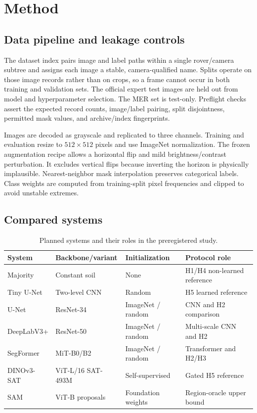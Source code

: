 \documentclass[11pt]{article}
\begin{document}
\section{Method}

\subsection{Data pipeline and leakage controls}

The dataset index pairs image and label paths within a single rover/camera subtree and assigns each
image a stable, camera-qualified name. Splits operate on those image records rather than on crops,
so a frame cannot occur in both training and validation sets. The official expert test images are
held out from model and hyperparameter selection. The MER set is test-only. Preflight checks assert
the expected record counts, image/label pairing, split disjointness, permitted mask values, and
archive/index fingerprints.

Images are decoded as grayscale and replicated to three channels. Training and evaluation resize
to $512\times512$ pixels and use ImageNet normalization. The frozen augmentation recipe allows a
horizontal flip and mild brightness/contrast perturbation. It excludes vertical flips because
inverting the horizon is physically implausible. Nearest-neighbor mask interpolation preserves
categorical labels. Class weights are computed from training-split pixel frequencies and clipped to
avoid unstable extremes.

\subsection{Compared systems}

\begin{table}[ht]
\centering
\caption{Planned systems and their roles in the preregistered study.}
\small
\begin{tabular}{@{}llll@{}}
\toprule
System & Backbone/variant & Initialization & Protocol role \\
\midrule
Majority & Constant soil & None & H1/H4 non-learned reference \\
Tiny U-Net & Two-level CNN & Random & H5 learned reference \\
U-Net & ResNet-34 & ImageNet / random & CNN and H2 comparison \\
DeepLabV3+ & ResNet-50 & ImageNet / random & Multi-scale CNN and H2 \\
SegFormer & MiT-B0/B2 & ImageNet / random & Transformer and H2/H3 \\
DINOv3-SAT & ViT-L/16 SAT-493M & Self-supervised & Gated H5 reference \\
SAM & ViT-B proposals & Foundation weights & Region-oracle upper bound \\
\bottomrule
\end{tabular}
\end{table}
\end{document}
